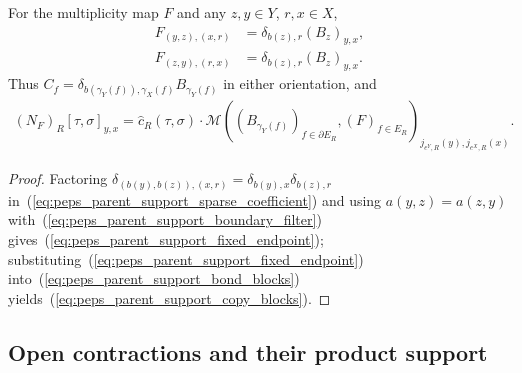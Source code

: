 \begin{lemma}%
    \label{thm:peps_parent_support_copy_blocks}
    \leanok
    For the multiplicity map $F$ and any $z,y\in Y$, $r,x\in X$,
    \begin{align}
        F_{(y,z),(x,r)} & =\delta_{b(z),r}(B_z)_{y,x}, \\
        F_{(z,y),(r,x)} & =\delta_{b(z),r}(B_z)_{y,x}.
        \label{eq:peps_parent_support_fixed_endpoint}
    \end{align}
    Thus $C_f=\delta_{b(\gamma_Y(f)),\gamma_X(f)}B_{\gamma_Y(f)}$
    in either orientation, and
    \begin{align}
        (N_F)_R[\tau,\sigma]_{y,x}
        =\widehat c_R(\tau,\sigma)\cdot
        \mathcal M((B_{\gamma_Y(f)})_{f\in\partial E_R},(F)_{f\in E_R})_
        {j_{e^Y,R}(y),j_{e^X,R}(x)}.
        \label{eq:peps_parent_support_copy_blocks}
    \end{align}
\end{lemma}
\begin{proof}\leanok
    Factoring $\delta_{(b(y),b(z)),(x,r)}=\delta_{b(y),x}\delta_{b(z),r}$
    in~(\ref{eq:peps_parent_support_sparse_coefficient}) and using
    $a(y,z)=a(z,y)$ with~(\ref{eq:peps_parent_support_boundary_filter}) gives~(\ref{eq:peps_parent_support_fixed_endpoint});
    substituting~(\ref{eq:peps_parent_support_fixed_endpoint}) into~(\ref{eq:peps_parent_support_bond_blocks})
    yields~(\ref{eq:peps_parent_support_copy_blocks}).
\end{proof}

\subsection{Open contractions and their product support}

